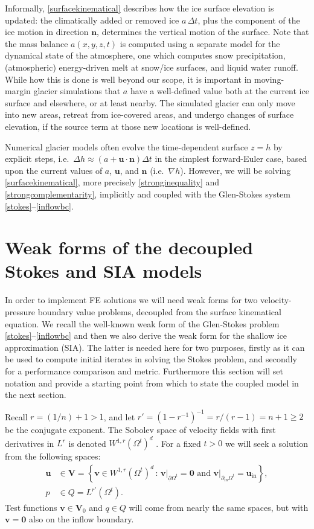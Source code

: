 \documentclass[letterpaper,final,12pt,reqno]{amsart}
\newcommand{\grad}{\nabla}
\newcommand{\bn}{\mathbf{n}}
\newcommand{\bu}{\mathbf{u}}
\newcommand{\bv}{\mathbf{v}}
\newcommand{\bV}{\mathbf{V}}
\newcommand{\bzero}{\bm{0}}
\begin{document}
Informally, \eqref{surfacekinematical} describes how the ice surface elevation is updated: the climatically added or removed ice $a\,\Delta t$, plus the component of the ice motion in direction $\bn$, determines the vertical motion of the surface.  Note that the mass balance $a(x,y,z,t)$ is computed using a separate model for the dynamical state of the atmosphere, one which computes snow precipitation, (atmospheric) energy-driven melt at snow/ice surfaces, and liquid water runoff.  While how this is done is well beyond our scope, it is important in moving-margin glacier simulations that $a$ have a well-defined value both at the current ice surface and elsewhere, or at least nearby.  The simulated glacier can only move into new areas, retreat from ice-covered areas, and undergo changes of surface elevation, if the source term at those new locations is well-defined.

Numerical glacier models often evolve the time-dependent surface $z=h$ by explicit steps, i.e.~$\Delta h \approx \left(a + \bu\cdot \bn\right) \Delta t$ in the simplest forward-Euler case, based upon the current values of $a$, $\bu$, and $\bn$ (i.e.~$\grad h$).  However, we will be solving \eqref{surfacekinematical}, more precisely \eqref{stronginequality} and \eqref{strongcomplementarity}, implicitly and coupled with the Glen-Stokes system \eqref{stokes}--\eqref{inflowbc}.


\section{Weak forms of the decoupled Stokes and SIA models} \label{sec:weakdecoupled}

In order to implement FE solutions we will need weak forms for two velocity-pressure boundary value problems, decoupled from the surface kinematical equation.  We recall the well-known weak form \cite{Bueler2021,Elmanetal2014,JouvetRappaz2011} of the Glen-Stokes problem \eqref{stokes}--\eqref{inflowbc} and then we also derive the weak form for the shallow ice approximation (SIA).  The latter is needed here for two purposes, firstly as it can be used to compute initial iterates in solving the Stokes problem, and secondly for a performance comparison and metric.  Furthermore this section will set notation and provide a starting point from which to state the coupled model in the next section.

Recall $r=(1/n) + 1>1$, and let $r'=(1-r^{-1})^{-1}=r/(r-1)=n+1\ge 2$ be the conjugate exponent.  The Sobolev space of velocity fields with first derivatives in $L^r$ is denoted $W^{1,r}(\Omega^t)^d$ \cite{Evans2010}.  For a fixed $t>0$ we will seek a solution from the following spaces:
\begin{align*}
\bu &\in \bV = \left\{\bv \in W^{1,r}(\Omega^t)^d\,:\,\bv\big|_{\underline{\partial} \Omega^t}=\bzero \text{ and } \bv\big|_{\partial_{\text{in}} \Omega^t} = \bu_{\text{in}}\right\}, \\
p &\in Q = L^{r'}(\Omega^t).
\end{align*}
Test functions $\bv \in \bV_0$ and $q\in Q$ will come from nearly the same spaces, but with $\bv=\bzero$ also on the inflow boundary.
\end{document}
